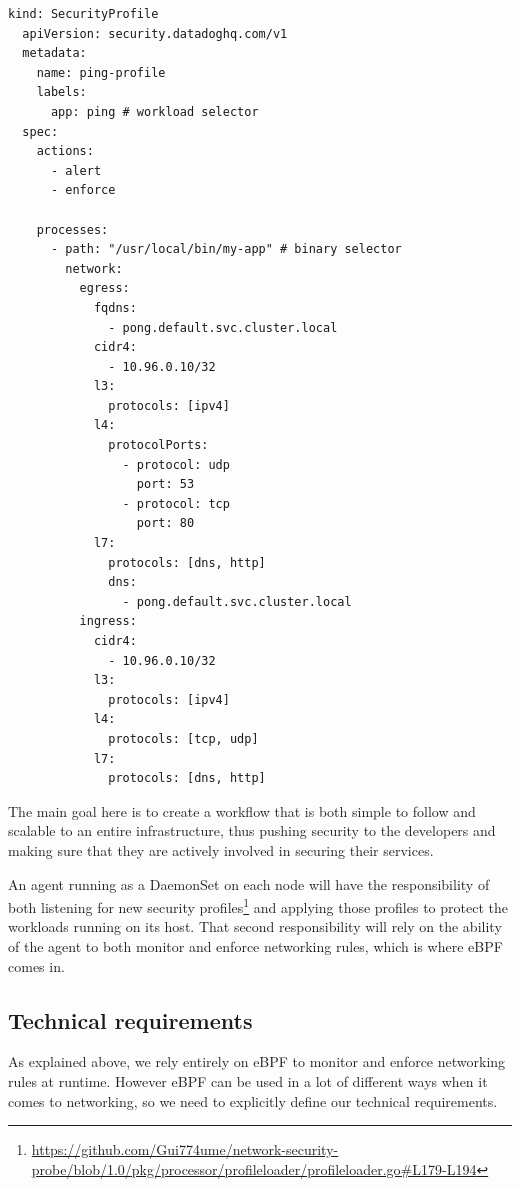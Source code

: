 \begin{lstlisting}[language={},basicstyle=\tiny,style=profileStyle,caption={Example of a custom SecurityProfile. This profile applies to all the containers of all the pods with the ping label.},label={lst:ProcessLevelNetworkSecurityMonitoring:securityProfile}]
  kind: SecurityProfile
  apiVersion: security.datadoghq.com/v1
  metadata:
    name: ping-profile
    labels:
      app: ping # workload selector
  spec:
    actions:
      - alert
      - enforce
  
    processes:
      - path: "/usr/local/bin/my-app" # binary selector
        network:
          egress:
            fqdns:
              - pong.default.svc.cluster.local
            cidr4:
              - 10.96.0.10/32
            l3:
              protocols: [ipv4]
            l4:
              protocolPorts:
                - protocol: udp
                  port: 53
                - protocol: tcp
                  port: 80
            l7:
              protocols: [dns, http]
              dns:
                - pong.default.svc.cluster.local
          ingress:
            cidr4:
              - 10.96.0.10/32
            l3:
              protocols: [ipv4]
            l4:
              protocols: [tcp, udp]
            l7:
              protocols: [dns, http]
\end{lstlisting}

The main goal here is to create a workflow that is both simple to follow and scalable to an entire infrastructure, thus pushing security to the developers and making sure that they are actively involved in securing their services.

An agent running as a DaemonSet on each node will have the responsibility of both listening for new security profiles\footnote{\url{https://github.com/Gui774ume/network-security-probe/blob/1.0/pkg/processor/profileloader/profileloader.go#L179-L194}} and applying those profiles to protect the workloads running on its host. That second responsibility will rely on the ability of the agent to both monitor and enforce networking rules, which is where eBPF comes in.

\subsection{Technical requirements}

As explained above, we rely entirely on eBPF to monitor and enforce networking rules at runtime. However eBPF can be used in a lot of different ways when it comes to networking, so we need to explicitly define our technical requirements.

